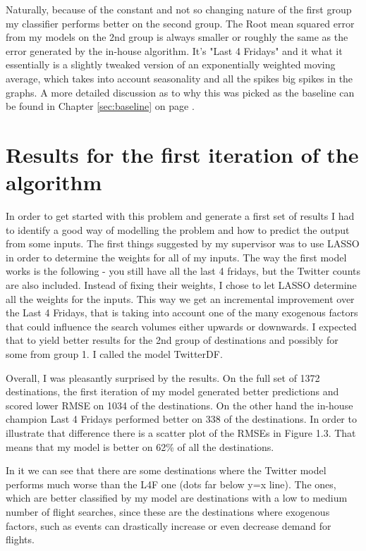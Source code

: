 \documentclass[minf,frontabs,twoside,singlespacing,parskip]{infthesis}
\begin{document}
Naturally, because of the constant and not so changing nature of the first group my classifier performs better on the second group. The Root mean squared error from my models on the 2nd group is always smaller or roughly the same as the error generated by the in-house algorithm. It's  "Last 4 Fridays" and it what it essentially is a slightly tweaked version of an exponentially weighted moving average, which takes into account seasonality and all the spikes big spikes in the graphs. A more detailed discussion as to why this was picked as the baseline can be found in Chapter \ref{sec:baseline} on page \pageref{sec:baseline}.

\section{Results for the first iteration of the algorithm}

In order to get started with this problem and generate a first set of results I had to identify a good way of modelling the problem and how to predict the output from some inputs. The first things suggested by my supervisor was to use LASSO \cite{lasso} in order to determine the weights for all of my inputs. The way the first model works is the following - you still have all the last 4 fridays, but the Twitter counts are also included. Instead of fixing their weights, I chose to let LASSO determine all the weights for the inputs. This way we get an incremental improvement over the Last 4 Fridays, that is taking into account one of the many exogenous factors that could influence the search volumes either upwards or downwards. I expected that to yield better results for the 2nd group of destinations and possibly for some from group 1. I called the model TwitterDF.

Overall, I was pleasantly surprised by the results. On the full set of 1372 destinations, the first iteration of my model generated better predictions and scored lower RMSE on 1034 of the destinations. On the other hand the in-house champion Last 4 Fridays performed better on 338 of the destinations. In order to illustrate that difference there is a scatter plot of the RMSEs in Figure 1.3. That means that my model is better on 62\% of all the destinations.


In it we can see that there are some destinations where the Twitter model performs much worse than the L4F one (dots far below y=x line). The ones, which are better classified by my model are destinations with a low to medium number of flight searches, since these are the destinations where exogenous factors, such as events can drastically increase or even decrease demand for flights.
\end{document}
